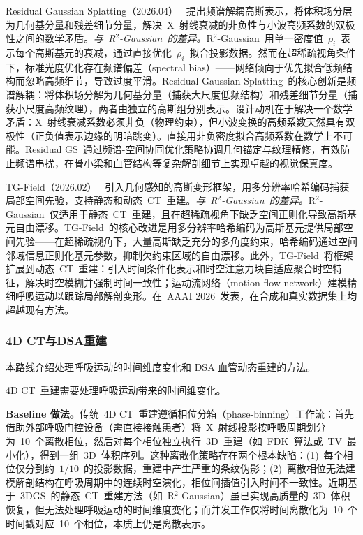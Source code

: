 Residual Gaussian Splatting（2026.04）~\cite{2604_27552} 提出频谱解耦高斯表示，将体积场分层为几何基分量和残差细节分量，解决~X~射线衰减的非负性与小波高频系数的双极性之间的数学矛盾。\textit{与~R$^2$-Gaussian~的差异。}R$^2$-Gaussian~用单一密度值~$\rho_i$~表示每个高斯基元的衰减，通过直接优化~$\rho_i$~拟合投影数据。然而在超稀疏视角条件下，标准光度优化存在频谱偏差（spectral bias）——网络倾向于优先拟合低频结构而忽略高频细节，导致过度平滑。Residual Gaussian Splatting~的核心创新是频谱解耦：将体积场分解为几何基分量（捕获大尺度低频结构）和残差细节分量（捕获小尺度高频纹理），两者由独立的高斯组分别表示。设计动机在于解决一个数学矛盾：X~射线衰减系数必须非负（物理约束），但小波变换的高频系数天然具有双极性（正负值表示边缘的明暗跳变）。直接用非负密度拟合高频系数在数学上不可能。Residual GS~通过频谱-空间协同优化策略协调几何锚定与纹理精修，有效防止频谱串扰，在骨小梁和血管结构等复杂解剖细节上实现卓越的视觉保真度。

TG-Field（2026.02）~\cite{2602_11705} 引入几何感知的高斯变形框架，用多分辨率哈希编码捕获局部空间先验，支持静态和动态~CT~重建。\textit{与~R$^2$-Gaussian~的差异。}R$^2$-Gaussian~仅适用于静态~CT~重建，且在超稀疏视角下缺乏空间正则化导致高斯基元自由漂移。TG-Field~的核心改进是用多分辨率哈希编码为高斯基元提供局部空间先验——在超稀疏视角下，大量高斯缺乏充分的多角度约束，哈希编码通过空间邻域信息正则化基元参数，抑制欠约束区域的自由漂移。此外，TG-Field~将框架扩展到动态~CT~重建：引入时间条件化表示和时空注意力块自适应聚合时空特征，解决时空模糊并强制时间一致性；运动流网络（motion-flow network）建模精细呼吸运动以跟踪局部解剖变形。在~AAAI 2026~发表，在合成和真实数据集上均超越现有方法。

\subsubsection{4D CT与DSA重建}

本路线介绍处理呼吸运动的时间维度变化和 DSA 血管动态重建的方法。

4D CT~重建需要处理呼吸运动带来的时间维变化。

\textbf{Baseline 做法。}传统~4D CT~重建遵循相位分箱（phase-binning）工作流：首先借助外部呼吸门控设备（需直接接触患者）将~X~射线投影按呼吸周期划分为~10~个离散相位，然后对每个相位独立执行~3D~重建（如~FDK~算法或~TV~最小化），得到一组~3D~体积序列。这种离散化策略存在两个根本缺陷：(1)~每个相位仅分到约~$1/10$~的投影数据，重建中产生严重的条纹伪影；(2)~离散相位无法建模解剖结构在呼吸周期中的连续时空演化，相位间插值引入时间不一致性。近期基于~3DGS~的静态~CT~重建方法（如~R$^{2}$-Gaussian）虽已实现高质量的~3D~体积恢复，但无法处理呼吸运动的时间维度变化；而并发工作仅将时间离散化为~10~个时间戳对应~10~个相位，本质上仍是离散表示。

